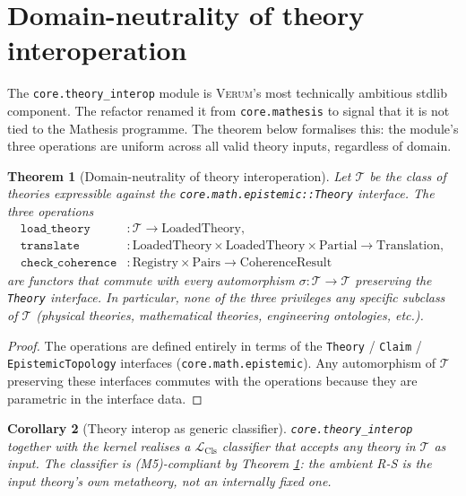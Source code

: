 \documentclass[11pt, a4paper]{article}
\newtheorem{theorem}{Theorem}[section]
\newtheorem{corollary}[theorem]{Corollary}
\theoremstyle{definition}
\theoremstyle{remark}
\newcommand{\LCls}{\mathcal{L}_{\mathrm{Cls}}}
\newcommand{\Verum}{\textsc{Verum}}
\begin{document}
\section{Domain-neutrality of theory interoperation}
\label{sec:theory-interop}

The \texttt{core.theory\_interop} module is \Verum{}'s most technically ambitious stdlib component. The refactor renamed it from \texttt{core.mathesis} to signal that it is not tied to the Mathesis programme. The theorem below formalises this: the module's three operations are uniform across all valid theory inputs, regardless of domain.

\begin{theorem}[Domain-neutrality of theory interoperation]
\label{thm:interop-domain-neutral}
Let $\mathcal{T}$ be the class of theories expressible against the \texttt{core.math.epistemic::Theory} interface. The three operations
\begin{align*}
\texttt{load\_theory} &: \mathcal{T} \to \mathrm{LoadedTheory}, \\
\texttt{translate}    &: \mathrm{LoadedTheory} \times \mathrm{LoadedTheory} \times \mathrm{Partial} \to \mathrm{Translation}, \\
\texttt{check\_coherence} &: \mathrm{Registry} \times \mathrm{Pairs} \to \mathrm{CoherenceResult}
\end{align*}
are functors that commute with every automorphism $\sigma : \mathcal{T} \to \mathcal{T}$ preserving the \texttt{Theory} interface. In particular, none of the three privileges any specific subclass of $\mathcal{T}$ (physical theories, mathematical theories, engineering ontologies, etc.).
\end{theorem}

\begin{proof}
The operations are defined entirely in terms of the \texttt{Theory} / \texttt{Claim} / \texttt{EpistemicTopology} interfaces (\texttt{core.math.epistemic}). Any automorphism of $\mathcal{T}$ preserving these interfaces commutes with the operations because they are parametric in the interface data.
\end{proof}

\begin{corollary}[Theory interop as generic classifier]
\label{cor:interop-generic-classifier}
\texttt{core.theory\_interop} together with the kernel realises a $\LCls$ classifier that accepts any theory in $\mathcal{T}$ as input. The classifier is (M5)-compliant by Theorem \ref{thm:interop-domain-neutral}: the ambient R-S is the input theory's own metatheory, not an internally fixed one.
\end{corollary}
\end{document}
